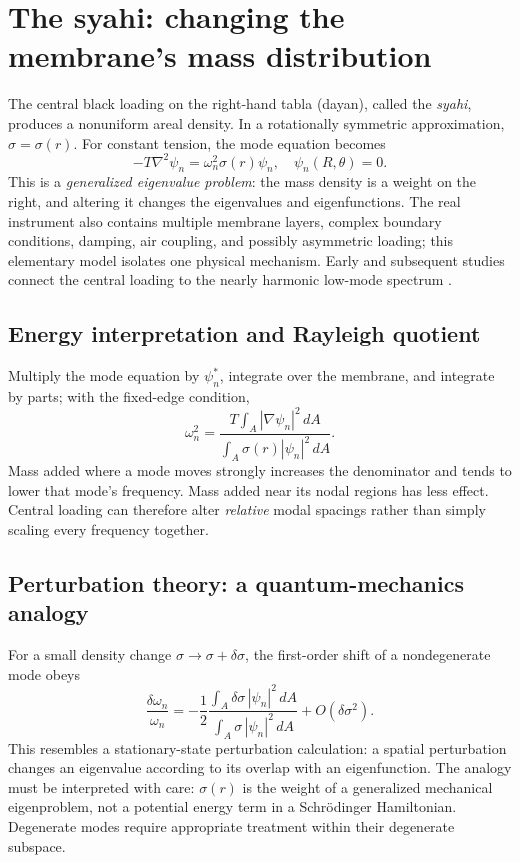 \documentclass[11pt,letterpaper]{article}
\begin{document}
\section{The syahi: changing the membrane's mass distribution}
The central black loading on the right-hand tabla (dayan), called the \emph{syahi}, produces a nonuniform areal density. In a rotationally symmetric approximation, \(\sigma=\sigma(r)\). For constant tension, the mode equation becomes
\begin{equation}\boxed{-T\nabla^2\psi_n=\omega_n^2\sigma(r)\psi_n,\quad \psi_n(R,\theta)=0.}\end{equation}
This is a \emph{generalized eigenvalue problem}: the mass density is a weight on the right, and altering it changes the eigenvalues and eigenfunctions. The real instrument also contains multiple membrane layers, complex boundary conditions, damping, air coupling, and possibly asymmetric loading; this elementary model isolates one physical mechanism. Early and subsequent studies connect the central loading to the nearly harmonic low-mode spectrum \cite{raman1920,raman1934,ramakrishnan1954,krishnamurthy1994,eigenspectra2009}.

\subsection{Energy interpretation and Rayleigh quotient}
Multiply the mode equation by \(\psi_n^*\), integrate over the membrane, and integrate by parts; with the fixed-edge condition,
\begin{equation}\boxed{\omega_n^2=\frac{T\int_A|\nabla\psi_n|^2\,dA}{\int_A\sigma(r)|\psi_n|^2\,dA}.}\end{equation}
Mass added where a mode moves strongly increases the denominator and tends to lower that mode's frequency. Mass added near its nodal regions has less effect. Central loading can therefore alter \emph{relative} modal spacings rather than simply scaling every frequency together.

\subsection{Perturbation theory: a quantum-mechanics analogy}
For a small density change \(\sigma\to\sigma+\delta\sigma\), the first-order shift of a nondegenerate mode obeys
\begin{equation}\boxed{\frac{\delta\omega_n}{\omega_n}=-\frac12\frac{\int_A\delta\sigma\,|\psi_n|^2\,dA}{\int_A\sigma\,|\psi_n|^2\,dA}+O(\delta\sigma^2).}\end{equation}
This resembles a stationary-state perturbation calculation: a spatial perturbation changes an eigenvalue according to its overlap with an eigenfunction. The analogy must be interpreted with care: \(\sigma(r)\) is the weight of a generalized mechanical eigenproblem, not a potential energy term in a Schr\"odinger Hamiltonian. Degenerate modes require appropriate treatment within their degenerate subspace.
\end{document}
